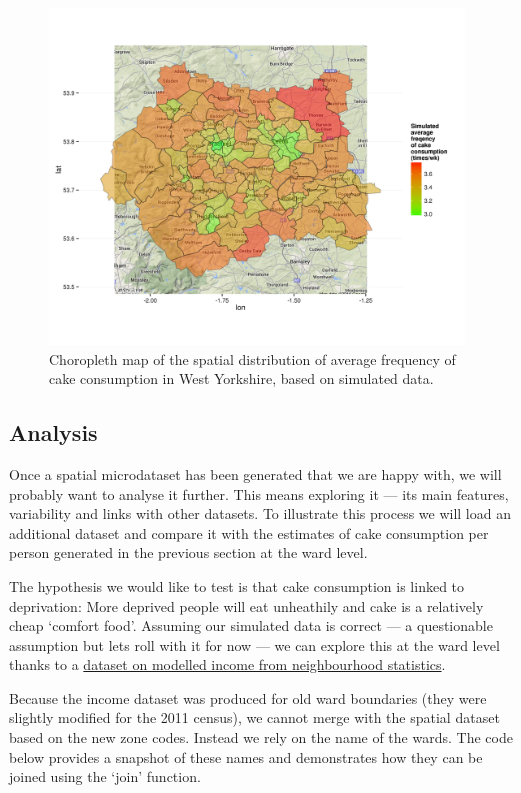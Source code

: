 \documentclass[a4paper, 11pt, twoside]{article}
\begin{document}
\begin{figure}[h]
 \centering
\includegraphics[width=11cm]{cakeMap}
\caption{Choropleth map of the spatial distribution of average frequency of
cake consumption in West Yorkshire, based on simulated data.} 
\label{fcmap}
\end{figure}

\subsection{Analysis} \label{sanalysis}
Once a spatial microdataset has been generated that we are happy with,
we will probably want to analyse it further. This means exploring it --- its main features,
variability and links with other datasets. To illustrate this process we will
load an additional dataset and compare it with the
estimates of cake consumption per person  generated in the previous
section at the ward level.  

The hypothesis we would like to test is that cake consumption is linked to deprivation:
More deprived people will eat unheathily and cake is a relatively cheap `comfort food'.
Assuming our simulated data is correct ---  a questionable assumption but lets roll with
it for now --- we can explore this at the ward level thanks to a 
\href{http://www.neighbourhood.statistics.gov.uk/dissemination/instanceSelection.do?JSAllowed=true&Function=&%24ph=61&CurrentPageId=61&step=2&datasetFamilyId=266&instanceSelection=121427&Next.x=22&Next.y=13&nsjs=true&nsck=false&nssvg=false&nswid=1920}{dataset on 
modelled income from neighbourhood statistics}.

Because the income dataset was produced for old ward boundaries (they were slightly
modified for the 2011 census), we cannot merge with the spatial dataset based on the
new zone codes. Instead we rely on the name of the wards. The code below provides a
snapshot of these names and demonstrates how they can be joined using the `join' function.
\end{document}
